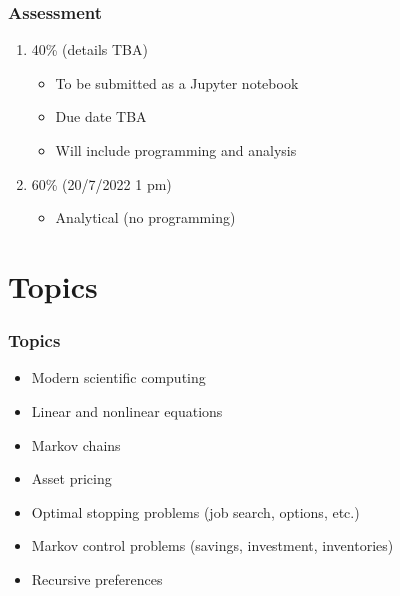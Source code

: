 \begin{frame}
    \frametitle{Assessment}
    
    \begin{enumerate}
        \item 40\%  (details TBA)
            \vspace{0.4em}
            \begin{itemize}
                \item To be submitted as a Jupyter notebook
            \vspace{0.4em}
                \item Due date TBA
            \vspace{0.4em}
                \item Will include programming and analysis
            \end{itemize}
            \vspace{0.4em}
            \vspace{0.4em}
        \item 60\%  (20/7/2022 1 pm)
            \vspace{0.4em}
            \begin{itemize}
                \item Analytical (no programming)
            \end{itemize}
    \end{enumerate}


\end{frame}





\section{Topics}

\begin{frame}
    \frametitle{Topics}

    \begin{itemize}
        \item Modern scientific computing
            \vspace{0.5em}
        \item Linear and nonlinear equations
            \vspace{0.5em}
        \item Markov chains
            \vspace{0.5em}
        \item Asset pricing
            \vspace{0.5em}
        \item Optimal stopping problems (job search, options, etc.)
            \vspace{0.5em}
        \item Markov control problems (savings, investment, inventories) 
            \vspace{0.5em}
        \item Recursive preferences
    \end{itemize}

\end{frame}


